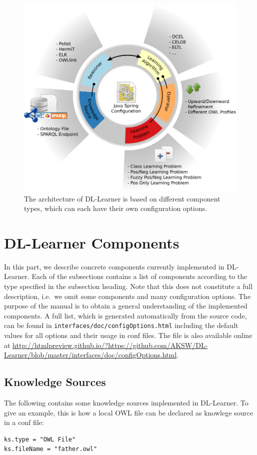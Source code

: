 \documentclass[a4paper,12pt]{scrartcl}
\begin{document}
\begin{figure}[t]
  \centering
  \includegraphics[width=.70\textwidth]{../../../../images/components.pdf}
  \caption{The architecture of DL-Learner is based on different component types, which can each have their own configuration options.}
  \label{fig:components}
\end{figure}

\section{DL-Learner Components}
\label{sec:components}

In this part, we describe concrete components currently implemented in DL-Learner. Each of the subsections contains a list of components according to the type specified in the subsection heading. Note that this does not constitute a full description, i.e.~we omit some components and many configuration options. The purpose of the manual is to obtain a general understanding of the implemented components. A full list, which is generated automatically from the source code, can be found in \verb|interfaces/doc/configOptions.html| including the default values for all options and their usage in conf files. The file is also available online at \url{http://htmlpreview.github.io/?https://github.com/AKSW/DL-Learner/blob/master/interfaces/doc/configOptions.html}.

\subsection{Knowledge Sources}
\label{sec:knowledgesources}

The following contains some knowledge sources implemented in DL-Learner. To give an example, this is how a local OWL file can be declared as knowlege source in a conf file:
\begin{verbatim}
ks.type = "OWL File"
ks.fileName = "father.owl"
\end{verbatim}
\end{document}
